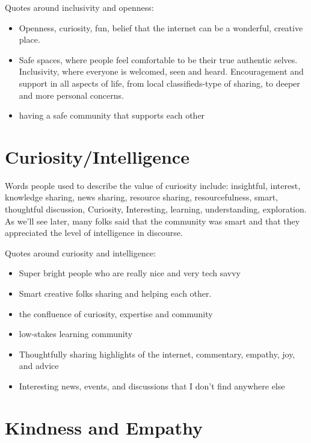 \documentclass[
]{book}
\providecommand{\tightlist}{%
  \setlength{\itemsep}{0pt}\setlength{\parskip}{0pt}}
\begin{document}
Quotes around inclusivity and openness:

\begin{itemize}
\tightlist
\item
  Openness, curiosity, fun, belief that the internet can be a wonderful, creative place.
\item
  Safe spaces, where people feel comfortable to be their true authentic selves. Inclusivity, where everyone is welcomed, seen and heard. Encouragement and support in all aspects of life, from local classifieds-type of sharing, to deeper and more personal concerns.
\item
  having a safe community that supports each other
\end{itemize}

\section{Curiosity/Intelligence}\label{curiosityintelligence}

Words people used to describe the value of curiosity include: insightful, interest, knowledge sharing, news sharing, resource sharing, resourcefulness, smart, thoughtful discussion, Curiosity, Interesting, learning, understanding, exploration. As we'll see later, many folks said that the community was smart and that they appreciated the level of intelligence in discourse.

Quotes around curiosity and intelligence:

\begin{itemize}
\tightlist
\item
  Super bright people who are really nice and very tech savvy
\item
  Smart creative folks sharing and helping each other.
\item
  the confluence of curiosity, expertise and community
\item
  low-stakes learning community
\item
  Thoughtfully sharing highlights of the internet, commentary, empathy, joy, and advice
\item
  Interesting news, events, and discussions that I don't find anywhere else
\end{itemize}

\section{Kindness and Empathy}\label{kindness-and-empathy}
\end{document}
